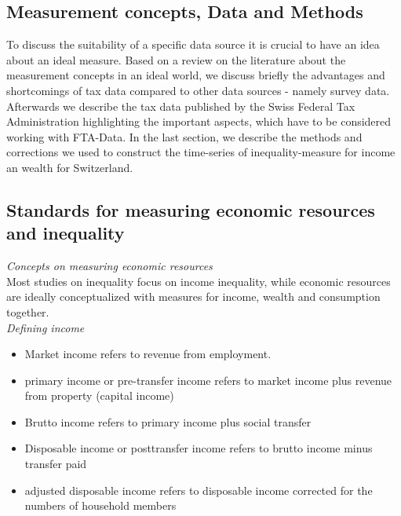 \documentclass[twoside]{article}\usepackage[]{graphicx}\usepackage[]{color}
\begin{document}
\begin{multicols}{2}
\section{Measurement concepts, Data and Methods}

To discuss the suitability of a specific data source it is crucial to have an idea about an ideal measure. Based on a review on the literature about the measurement concepts in an ideal world, we discuss briefly the advantages and shortcomings of tax data compared to other data sources - namely survey data. Afterwards we describe the tax data published by the Swiss Federal Tax Administration highlighting the important aspects, which have to be considered working with FTA-Data. In the last section, we describe the methods and corrections we used to construct the time-series of inequality-measure for income an wealth for Switzerland.

\subsection{Standards for measuring economic resources and inequality}

\emph{Concepts on measuring economic resources}  \\
Most studies on inequality focus on income inequality, while economic resources are ideally conceptualized with measures for income, wealth and consumption together. \\


\emph{Defining income}

\begin{itemize}
\item Market income refers to revenue from employment.
\item primary income or pre-transfer income refers to  market income plus revenue from property (capital income)
\item Brutto income refers to  primary income plus social transfer
\item Disposable income or posttransfer income refers to  brutto income minus transfer paid 
\item adjusted disposable income refers to  disposable income corrected for the numbers of household members 
\end{itemize}


\end{multicols}
\end{document}
